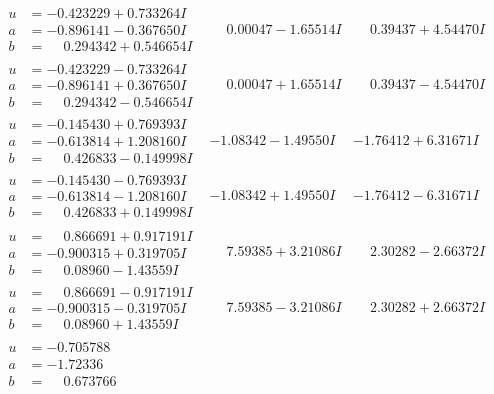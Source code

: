 \documentclass[1p]{elsarticle_modified}
\theoremstyle{definition}
\begin{document}
$$\begin{array}{c|c|c}
\begin{aligned}
u &= -0.423229 + 0.733264 I \\
a &= -0.896141 - 0.367650 I \\
b &= \phantom{-}0.294342 + 0.546654 I\end{aligned}
 & \phantom{-}0.00047 - 1.65514 I & \phantom{-}0.39437 + 4.54470 I \\ \hline\begin{aligned}
u &= -0.423229 - 0.733264 I \\
a &= -0.896141 + 0.367650 I \\
b &= \phantom{-}0.294342 - 0.546654 I\end{aligned}
 & \phantom{-}0.00047 + 1.65514 I & \phantom{-}0.39437 - 4.54470 I \\ \hline\begin{aligned}
u &= -0.145430 + 0.769393 I \\
a &= -0.613814 + 1.208160 I \\
b &= \phantom{-}0.426833 - 0.149998 I\end{aligned}
 & -1.08342 - 1.49550 I & -1.76412 + 6.31671 I \\ \hline\begin{aligned}
u &= -0.145430 - 0.769393 I \\
a &= -0.613814 - 1.208160 I \\
b &= \phantom{-}0.426833 + 0.149998 I\end{aligned}
 & -1.08342 + 1.49550 I & -1.76412 - 6.31671 I \\ \hline\begin{aligned}
u &= \phantom{-}0.866691 + 0.917191 I \\
a &= -0.900315 + 0.319705 I \\
b &= \phantom{-}0.08960 - 1.43559 I\end{aligned}
 & \phantom{-}7.59385 + 3.21086 I & \phantom{-}2.30282 - 2.66372 I \\ \hline\begin{aligned}
u &= \phantom{-}0.866691 - 0.917191 I \\
a &= -0.900315 - 0.319705 I \\
b &= \phantom{-}0.08960 + 1.43559 I\end{aligned}
 & \phantom{-}7.59385 - 3.21086 I & \phantom{-}2.30282 + 2.66372 I \\ \hline\begin{aligned}
u &= -0.705788\phantom{ +0.000000I} \\
a &= -1.72336\phantom{ +0.000000I} \\
b &= \phantom{-}0.673766\phantom{ +0.000000I}\end{aligned}

\end{array}$$
\end{document}
